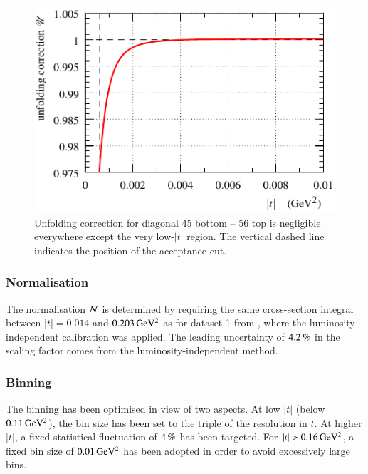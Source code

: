 \begin{figure}
\begin{center}
\includegraphics{fig/unfolding.pdf}
\caption{%
Unfolding correction for diagonal 45 bottom -- 56 top is negligible everywhere except the very low-$|t|$ region. The vertical dashed line indicates the position of the acceptance cut.
}
\label{fig:align meth}
\end{center}
\end{figure}


\subsubsection{Normalisation}
\label{sec:normalisation}

The normalisation ${\cal N}$ is determined by requiring the same cross-section integral between $|t| = 0.014$ and $0.203\,{\rm GeV^2}$ as for dataset 1 from \cite{prl111}, where the luminosity-independent calibration was applied. The leading uncertainty of $4.2\,{\rm \%}$ in the scaling factor comes from the luminosity-independent method.



\subsubsection{Binning}
\label{sec:binning}

The binning has been optimised in view of two aspects. At low $|t|$ (below $0.11\,{\rm GeV^2}$), the bin size has been set to the triple of the resolution in $t$. At higher $|t|$, a fixed statistical fluctuation of $4\,{\rm \%}$ has been targeted. For $|t| > 0.16\,{\rm GeV^2}$, a fixed bin size of $0.01\,{\rm GeV^2}$ has been adopted in order to avoid excessively large bins.


